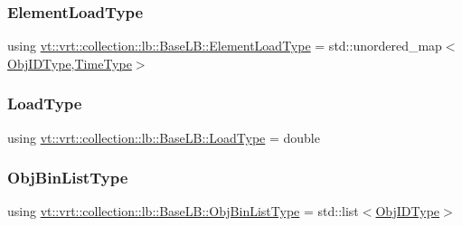 \mbox{\label{structvt_1_1vrt_1_1collection_1_1lb_1_1_base_l_b_aa286d31a0820a8fc9218ccb858368fca}} 
\subsubsection{\texorpdfstring{Element\+Load\+Type}{ElementLoadType}}
{\footnotesize\ttfamily using \hyperlink{structvt_1_1vrt_1_1collection_1_1lb_1_1_base_l_b_aa286d31a0820a8fc9218ccb858368fca}{vt\+::vrt\+::collection\+::lb\+::\+Base\+L\+B\+::\+Element\+Load\+Type} =  std\+::unordered\+\_\+map$<$\hyperlink{structvt_1_1vrt_1_1collection_1_1lb_1_1_base_l_b_a15a2f756b59c8c2437985206b32aa403}{Obj\+I\+D\+Type},\hyperlink{namespacevt_a876a9d0cd5a952859c72de8a46881442}{Time\+Type}$>$}

\mbox{\label{structvt_1_1vrt_1_1collection_1_1lb_1_1_base_l_b_a215e22b9f12678303f49615ae3be05cc}} 
\subsubsection{\texorpdfstring{Load\+Type}{LoadType}}
{\footnotesize\ttfamily using \hyperlink{structvt_1_1vrt_1_1collection_1_1lb_1_1_base_l_b_a215e22b9f12678303f49615ae3be05cc}{vt\+::vrt\+::collection\+::lb\+::\+Base\+L\+B\+::\+Load\+Type} =  double}

\mbox{\label{structvt_1_1vrt_1_1collection_1_1lb_1_1_base_l_b_ab29c64ca66a928f34cf638dad6163f80}} 
\subsubsection{\texorpdfstring{Obj\+Bin\+List\+Type}{ObjBinListType}}
{\footnotesize\ttfamily using \hyperlink{structvt_1_1vrt_1_1collection_1_1lb_1_1_base_l_b_ab29c64ca66a928f34cf638dad6163f80}{vt\+::vrt\+::collection\+::lb\+::\+Base\+L\+B\+::\+Obj\+Bin\+List\+Type} =  std\+::list$<$\hyperlink{structvt_1_1vrt_1_1collection_1_1lb_1_1_base_l_b_a15a2f756b59c8c2437985206b32aa403}{Obj\+I\+D\+Type}$>$}

